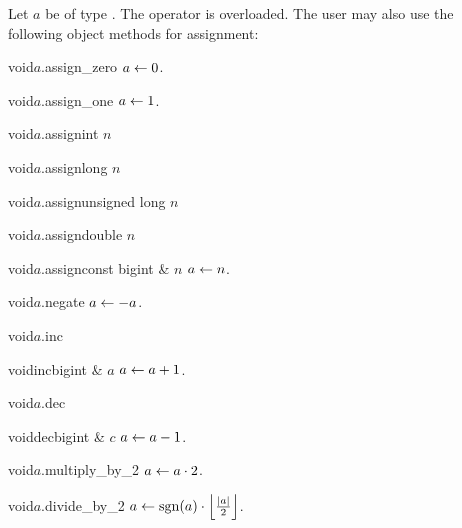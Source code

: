 \ASGN

Let $a$ be of type .  The operator \code{=} is overloaded.  The user may also use
the following object methods for assignment:

\begin{fcode}{void}{$a$.assign_zero}{}
  $a \leftarrow 0$.
\end{fcode}

\begin{fcode}{void}{$a$.assign_one}{}
  $a \leftarrow 1$.
\end{fcode}

\begin{fcode}{void}{$a$.assign}{int $n$}\end{fcode}
\begin{fcode}{void}{$a$.assign}{long $n$}\end{fcode}
\begin{fcode}{void}{$a$.assign}{unsigned long $n$}\end{fcode}
\begin{fcode}{void}{$a$.assign}{double $n$}\end{fcode}
\begin{fcode}{void}{$a$.assign}{const bigint & $n$}
  $a \leftarrow n$.
\end{fcode}



\MODF

\begin{fcode}{void}{$a$.negate}{}
  $a \leftarrow -a$.
\end{fcode}

\begin{fcode}{void}{$a$.inc}{}\end{fcode}
\begin{fcode}{void}{inc}{bigint & $a$}
  $a \leftarrow a + 1$.
\end{fcode}

\begin{fcode}{void}{$a$.dec}{}\end{fcode}
\begin{fcode}{void}{dec}{bigint & $c$}
  $a \leftarrow a - 1$.
\end{fcode}

\begin{fcode}{void}{$a$.multiply_by_2}{}
  $a \leftarrow a \cdot 2$.
\end{fcode}

\begin{fcode}{void}{$a$.divide_by_2}{}
  $a \leftarrow \operatorname{sgn}(a) \cdot \left\lfloor \frac{|a|}{2} \right\rfloor$.
\end{fcode}

